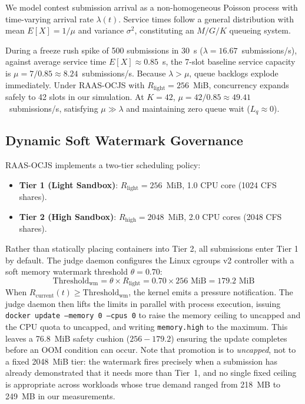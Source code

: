 \documentclass[conference]{IEEEtran}
\begin{document}
We model contest submission arrival as a non-homogeneous Poisson process with time-varying arrival rate $\lambda(t)$. Service times follow a general distribution with mean $E[X] = 1/\mu$ and variance $\sigma^2$, constituting an $M/G/K$ queueing system.

During a freeze rush spike of 500 submissions in 30~s ($\lambda = 16.67$~submissions/s), against average service time $E[X] \approx 0.85$~s, the 7-slot baseline service capacity is $\mu = 7 / 0.85 \approx 8.24$~submissions/s. Because $\lambda > \mu$, queue backlogs explode immediately. Under RAAS-OCJS with $R_{\mathrm{light}} = 256$~MiB, concurrency expands safely to 42 slots in our simulation. At $K = 42$, $\mu = 42 / 0.85 \approx 49.41$~submissions/s, satisfying $\mu \gg \lambda$ and maintaining zero queue wait ($L_q \approx 0$).

\subsection{Dynamic Soft Watermark Governance}
RAAS-OCJS implements a two-tier scheduling policy:
\begin{itemize}
    \item \textbf{Tier 1 (Light Sandbox)}: $R_{\mathrm{light}} = 256$~MiB, 1.0 CPU core (1024 CFS shares).
    \item \textbf{Tier 2 (High Sandbox)}: $R_{\mathrm{high}} = 2048$~MiB, 2.0 CPU cores (2048 CFS shares).
\end{itemize}
Rather than statically placing containers into Tier 2, all submissions enter Tier 1 by default. The judge daemon configures the Linux cgroups v2 controller with a soft memory watermark threshold $\theta = 0.70$:
\begin{equation}
\mathrm{Threshold}_{\mathrm{wm}} = \theta \times R_{\mathrm{light}} = 0.70 \times 256\text{ MiB} = 179.2\text{ MiB}
\end{equation}
When $R_{\mathrm{current}}(t) \ge \mathrm{Threshold}_{\mathrm{wm}}$, the kernel emits a pressure notification. The judge daemon then lifts the limits in parallel with process execution, issuing \texttt{docker update --memory 0 --cpus 0} to raise the memory ceiling to uncapped and the CPU quota to uncapped, and writing \texttt{memory.high} to the maximum. This leaves a 76.8~MiB safety cushion ($256 - 179.2$) ensuring the update completes before an OOM condition can occur. Note that promotion is to \emph{uncapped}, not to a fixed 2048~MiB tier: the watermark fires precisely when a submission has already demonstrated that it needs more than Tier~1, and no single fixed ceiling is appropriate across workloads whose true demand ranged from 218~MB to 249~MB in our measurements.
\end{document}
